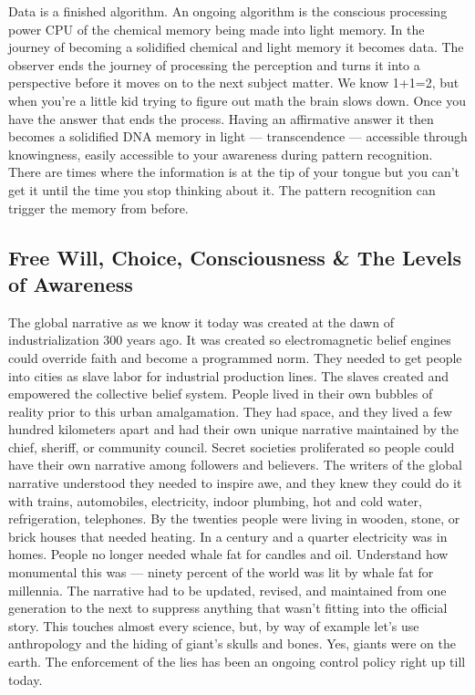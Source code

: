Data is a finished algorithm. An ongoing algorithm is the conscious
processing power CPU of the chemical memory being made into light
memory. In the journey of becoming a solidified chemical and light
memory it becomes data. The observer ends the journey of processing the
perception and turns it into a perspective before it moves on to the
next subject matter. We know 1+1=2, but when you're a little kid trying
to figure out math the brain slows down. Once you have the answer that
ends the process. Having an affirmative answer it then becomes a
solidified DNA memory in light --- transcendence --- accessible through
knowingness, easily accessible to your awareness during pattern
recognition. There are times where the information is at the tip of your
tongue but you can't get it until the time you stop thinking about it.
The pattern recognition can trigger the memory from before.

\subsection{Free Will, Choice, Consciousness \& The Levels of
Awareness}\label{free-will-choice-consciousness-the-levels-of-awareness}

The global narrative as we know it today was created at the dawn of
industrialization 300 years ago. It was created so electromagnetic
belief engines could override faith and become a programmed norm. They
needed to get people into cities as slave labor for industrial
production lines. The slaves created and empowered the collective belief
system. People lived in their own bubbles of reality prior to this urban
amalgamation. They had space, and they lived a few hundred kilometers
apart and had their own unique narrative maintained by the chief,
sheriff, or community council. Secret societies proliferated so people
could have their own narrative among followers and believers. The
writers of the global narrative understood they needed to inspire awe,
and they knew they could do it with trains, automobiles, electricity,
indoor plumbing, hot and cold water, refrigeration, telephones. By the
twenties people were living in wooden, stone, or brick houses that
needed heating. In a century and a quarter electricity was in homes.
People no longer needed whale fat for candles and oil. Understand how
monumental this was --- ninety percent of the world was lit by whale fat
for millennia. The narrative had to be updated, revised, and maintained
from one generation to the next to suppress anything that wasn't fitting
into the official story. This touches almost every science, but, by way
of example let's use anthropology and the hiding of giant's skulls and
bones. Yes, giants were on the earth. The enforcement of the lies has
been an ongoing control policy right up till today.

